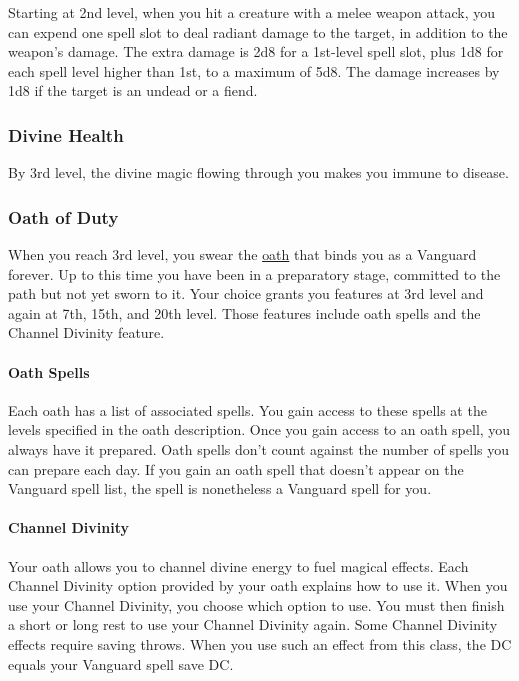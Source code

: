 Starting at 2nd level, when you hit a creature with a melee weapon
attack, you can expend one spell slot to deal radiant damage to the
target, in addition to the weapon's damage. The extra damage is 2d8 for
a 1st-level spell slot, plus 1d8 for each spell level higher than 1st,
to a maximum of 5d8. The damage increases by 1d8 if the target is an
undead or a fiend.

\subsubsection{Divine Health}\label{vanguard-feature-divine-health}

By 3rd level, the divine magic flowing through you makes you immune to
disease.

\subsubsection{Oath of Duty}\label{vanguard-feature-oath-of-duty}

When you reach 3rd level, you swear the
\hyperref[vanguard-subclasses]{oath} that binds you as a Vanguard
forever. Up to this time you have been in a preparatory stage, committed
to the path but not yet sworn to it. Your choice grants you features at
3rd level and again at 7th, 15th, and 20th level. Those features include
oath spells and the Channel Divinity feature.

\paragraph{Oath Spells}\label{vanguard-feature-oath-of-duty-oath-spells}

Each oath has a list of associated spells. You gain access to these
spells at the levels specified in the oath description. Once you gain
access to an oath spell, you always have it prepared. Oath spells don't
count against the number of spells you can prepare each day. If you gain
an oath spell that doesn't appear on the Vanguard spell list, the spell
is nonetheless a Vanguard spell for you.

\paragraph{Channel
Divinity}\label{vanguard-feature-oath-of-duty-channel-divinity}

Your oath allows you to channel divine energy to fuel magical effects.
Each Channel Divinity option provided by your oath explains how to use
it. When you use your Channel Divinity, you choose which option to use.
You must then finish a short or long rest to use your Channel Divinity
again. Some Channel Divinity effects require saving throws. When you use
such an effect from this class, the DC equals your Vanguard spell save
DC.

